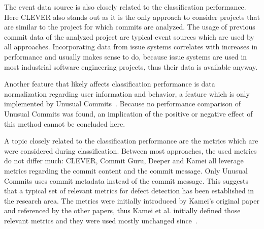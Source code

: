 The event data source is also closely related to the classification performance. Here CLEVER also stands out as it is the only approach to consider projects that are similar to the project for which commits are analyzed. The usage of previous commit data of the analyzed project are typical event sources which are used by all approaches. Incorporating data from issue systems correlates with increases in performance and usually makes sense to do, because issue systems are used in most industrial software engineering projects, thus their data is available anyway.

Another feature that likely affects classification performance is data normalization regarding user information and behavior, a feature which is only implemented by Unusual Commits~\cite{Goyal2017}.
Because no performance comparison of Unusual Commits was found, an implication of the positive or negative effect of this method cannot be concluded here.

A topic closely related to the classification performance are the metrics which are were considered during classification. Between most approaches, the used metrics do not differ much: CLEVER, Commit Guru, Deeper and Kamei all leverage metrics regarding the commit content and the commit message. Only Unusual Commits uses commit metadata instead of the commit message. This suggests that a typical set of relevant metrics for defect detection has been established in the research area. The metrics were initially introduced by Kamei's original paper and referenced by the other papers, thus Kamei et al. initially defined those relevant metrics and they were used mostly unchanged since~\cite{Kamei2013}.

